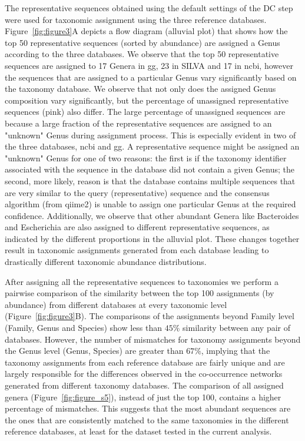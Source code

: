   The representative sequences obtained using the default settings of the DC step were used for taxonomic assignment using the three reference databases.
  Figure~\ref{fig:figure3}A depicts a flow diagram (alluvial plot) that shows how the top 50 representative sequences (sorted by abundance) are assigned a Genus according to the three databases.
  We observe that the top 50 representative sequences are assigned to 17 Genera in \ac{gg}, 23 in SILVA and 17 in \ac{ncbi}, however the sequences that are assigned to a particular Genus vary significantly based on the taxonomy database.
  We observe that not only does the assigned Genus composition vary significantly, but the percentage of unassigned representative sequences (pink) also differ.
  The large percentage of unassigned sequences are because a large fraction of the representative sequences are assigned to an "unknown" Genus during assignment process.
  This is especially evident in two of the three databases, \ac{ncbi} and \ac{gg}.
  A representative sequence might be assigned an "unknown" Genus for one of two reasons: the first is if the taxonomy identifier associated with the sequence in the database did not contain a given Genus; the second, more likely, reason is that the database contains multiple sequences that are very similar to the query (representative) sequence and the consensus algorithm (from \ac{qiime2}) is unable to assign one particular Genus at the required confidence.
  Additionally, we observe that other abundant Genera like Bacteroides and Escherichia are also assigned to different representative sequences, as indicated by the different proportions in the alluvial plot.
  These changes together result in taxonomic assignments generated from each database leading to drastically different taxonomic abundance distributions.

  After assigning all the representative sequences to taxonomies we perform a pairwise comparison of the similarity between the top 100 assignments (by abundance) from different databases at every taxonomic level (Figure~\ref{fig:figure3}B).
  The comparisons of the assignments beyond Family level (Family, Genus and Species) show less than $45\%$ similarity between any pair of databases.
  However, the number of mismatches for taxonomy assignments beyond the Genus level (Genus, Species) are greater than $67\%$, implying that the taxonomy assignments from each reference database are fairly unique and are largely responsible for the differences observed in the co-occurrence networks generated from different taxonomy databases.
  The comparison of all assigned genera (Figure~\ref{fig:figure_s5}), instead of just the top 100, contains a higher percentage of mismatches.
  This suggests that the most abundant sequences are the ones that are consistently matched to the same taxonomies in the different reference databases, at least for the dataset tested in the current analysis.

